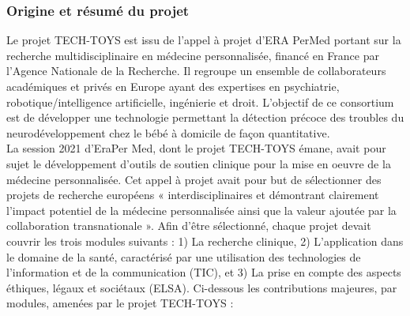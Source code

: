 \documentclass[8pt]{article}
\begin{document}
\subsubsection{Origine et résumé du projet}
\par Le projet TECH-TOYS est issu de l’appel à projet d’ERA PerMed portant sur la recherche multidisciplinaire
en médecine personnalisée, financé en France par l’Agence Nationale de la Recherche. Il regroupe un ensemble de collaborateurs académiques et privés en Europe ayant des expertises en psychiatrie, robotique/intelligence artificielle, ingénierie et droit. L’objectif de ce consortium est de développer une technologie permettant la détection précoce des troubles du neurodéveloppement chez le bébé à domicile de façon quantitative.\\
La session 2021 d’EraPer Med, dont le projet TECH-TOYS émane, avait pour sujet le développement
d’outils de soutien clinique pour la mise en oeuvre de la médecine personnalisée. Cet appel à projet avait
pour but de sélectionner des projets de recherche européens « interdisciplinaires et démontrant clairement l’impact potentiel de la médecine personnalisée ainsi que la valeur ajoutée par la collaboration transnationale »\cite{noauthor_joint_nodate}. Afin d’être sélectionné, chaque projet devait couvrir les trois modules suivants : 1) La recherche clinique, 2) L’application dans le domaine de la santé, caractérisé par une utilisation des technologies de l’information et de la communication (TIC), et 3) La prise en compte des aspects éthiques, légaux et sociétaux (ELSA). Ci-dessous les contributions majeures, par modules, amenées par le projet
TECH-TOYS :
\end{document}
